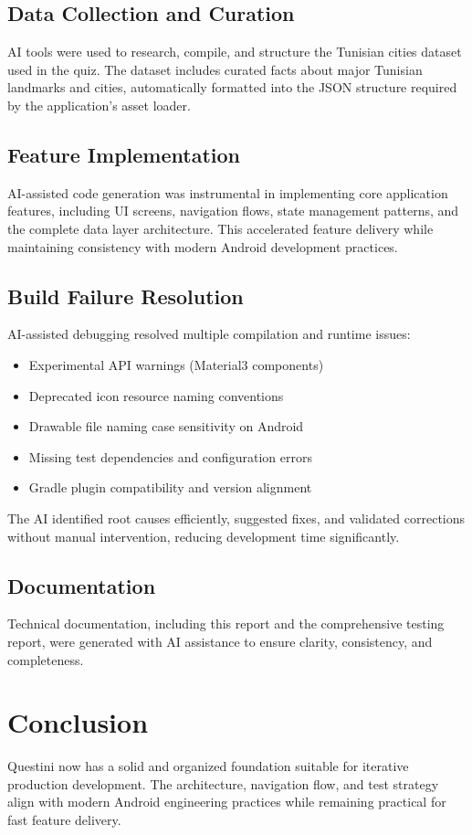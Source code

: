 \documentclass[12pt,a4paper]{article}
\begin{document}
\subsection{Data Collection and Curation}
AI tools were used to research, compile, and structure the Tunisian cities dataset used in the quiz. The dataset includes curated facts about major Tunisian landmarks and cities, automatically formatted into the JSON structure required by the application's asset loader.

\subsection{Feature Implementation}
AI-assisted code generation was instrumental in implementing core application features, including UI screens, navigation flows, state management patterns, and the complete data layer architecture. This accelerated feature delivery while maintaining consistency with modern Android development practices.

\subsection{Build Failure Resolution}
AI-assisted debugging resolved multiple compilation and runtime issues:
\begin{itemize}
    \item Experimental API warnings (Material3 components)
    \item Deprecated icon resource naming conventions
    \item Drawable file naming case sensitivity on Android
    \item Missing test dependencies and configuration errors
    \item Gradle plugin compatibility and version alignment
\end{itemize}

The AI identified root causes efficiently, suggested fixes, and validated corrections without manual intervention, reducing development time significantly.

\subsection{Documentation}
Technical documentation, including this report and the comprehensive testing report, were generated with AI assistance to ensure clarity, consistency, and completeness.

\section{Conclusion}
Questini now has a solid and organized foundation suitable for iterative production development. The architecture, navigation flow, and test strategy align with modern Android engineering practices while remaining practical for fast feature delivery.
\end{document}
